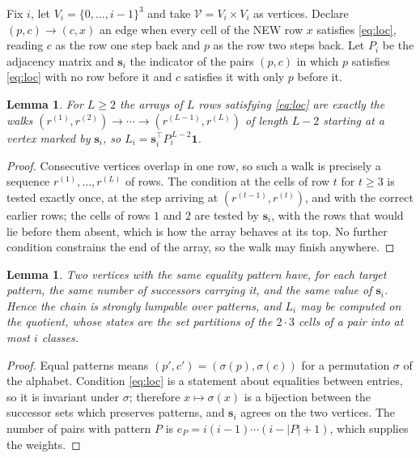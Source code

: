 \documentclass[11pt,a4paper]{article}
\theoremstyle{plain}
\newtheorem{lemma}[theorem]{Lemma}
\theoremstyle{definition}
\begin{document}
Fix $i$, let $V_i=\{0,\dots,i-1\}^{3}$ and take $\mathcal V=V_i\times V_i$ as vertices.
Declare $(p,c)\to(c,x)$ an edge when every cell of the NEW row $x$ satisfies
\eqref{eq:loc}, reading $c$ as the row one step back and $p$ as the row two steps
back. Let $P_i$ be the adjacency matrix and $\mathbf{s}_i$ the indicator of the pairs
$(p,c)$ in which $p$ satisfies \eqref{eq:loc} with no row before it and $c$ satisfies it
with only $p$ before it.

\begin{lemma}\label{lem:walk}
For $L\ge2$ the arrays of $L$ rows satisfying \eqref{eq:loc} are exactly the walks
$(r^{(1)},r^{(2)})\to\cdots\to(r^{(L-1)},r^{(L)})$ of length $L-2$ starting at a
vertex marked by $\mathbf{s}_i$, so
$L_i=\mathbf{s}_i^{\!\top}P_i^{\,L-2}\mathbf{1}$.
\end{lemma}

\begin{proof}
Consecutive vertices overlap in one row, so such a walk is precisely a sequence
$r^{(1)},\dots,r^{(L)}$ of rows. The condition at the cells of row $t$ for $t\ge3$
is tested exactly once, at the step arriving at $(r^{(t-1)},r^{(t)})$, and with the
correct earlier rows; the cells of rows $1$ and $2$ are tested by $\mathbf{s}_i$, with
the rows that would lie before them absent, which is how the array behaves at its top. No
further condition constrains the end of the array, so the walk may finish anywhere.
\end{proof}

\begin{lemma}\label{lem:lump}
Two vertices with the same equality pattern have, for each target pattern, the same number of
successors carrying it, and the same value of $\mathbf{s}_i$. Hence the chain is strongly
lumpable over patterns, and $L_i$ may be computed on the quotient, whose states are the set
partitions of the $2\cdot3$ cells of a pair into at most $i$ classes.
\end{lemma}

\begin{proof}
Equal patterns means $(p',c')=(\sigma(p),\sigma(c))$ for a permutation $\sigma$ of the
alphabet. Condition \eqref{eq:loc} is a statement about equalities between entries, so it is
invariant under $\sigma$; therefore $x\mapsto\sigma(x)$ is a bijection between the successor
sets which preserves patterns, and $\mathbf{s}_i$ agrees on the two vertices. The number of
pairs with pattern $P$ is $e_P=i(i-1)\cdots(i-|P|+1)$, which supplies the weights.
\end{proof}
\end{document}
